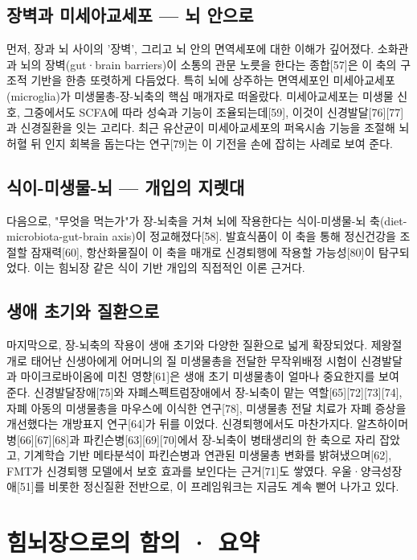 \documentclass[12pt,oneside]{book}
\begin{document}
\subsection{장벽과 미세아교세포 — 뇌 안으로}

먼저, 장과 뇌 사이의 '장벽', 그리고 뇌 안의 면역세포에 대한 이해가 깊어졌다. 소화관과 뇌의 장벽(gut·brain barriers)이 소통의 관문 노릇을 한다는 종합[57]은 이 축의 구조적 기반을 한층 또렷하게 다듬었다. 특히 뇌에 상주하는 면역세포인 미세아교세포(microglia)가 미생물총-장-뇌축의 핵심 매개자로 떠올랐다. 미세아교세포는 미생물 신호, 그중에서도 SCFA에 따라 성숙과 기능이 조율되는데[59], 이것이 신경발달[76][77]과 신경질환을 잇는 고리다. 최근 유산균이 미세아교세포의 퍼옥시솜 기능을 조절해 뇌허혈 뒤 인지 회복을 돕는다는 연구[79]는 이 기전을 손에 잡히는 사례로 보여 준다.

\subsection{식이-미생물-뇌 — 개입의 지렛대}

다음으로, "무엇을 먹는가"가 장-뇌축을 거쳐 뇌에 작용한다는 식이-미생물-뇌 축(diet-microbiota-gut-brain axis)이 정교해졌다[58]. 발효식품이 이 축을 통해 정신건강을 조절할 잠재력[60], 항산화물질이 이 축을 매개로 신경퇴행에 작용할 가능성[80]이 탐구되었다. 이는 힘뇌장 같은 식이 기반 개입의 직접적인 이론 근거다.

\subsection{생애 초기와 질환으로}

마지막으로, 장-뇌축의 작용이 생애 초기와 다양한 질환으로 넓게 확장되었다. 제왕절개로 태어난 신생아에게 어머니의 질 미생물총을 전달한 무작위배정 시험이 신경발달과 마이크로바이옴에 미친 영향[61]은 생애 초기 미생물총이 얼마나 중요한지를 보여 준다. 신경발달장애[75]와 자폐스펙트럼장애에서 장-뇌축이 맡는 역할[65][72][73][74], 자폐 아동의 미생물총을 마우스에 이식한 연구[78], 미생물총 전달 치료가 자폐 증상을 개선했다는 개방표지 연구[64]가 뒤를 이었다. 신경퇴행에서도 마찬가지다. 알츠하이머병[66][67][68]과 파킨슨병[63][69][70]에서 장-뇌축이 병태생리의 한 축으로 자리 잡았고, 기계학습 기반 메타분석이 파킨슨병과 연관된 미생물총 변화를 밝혀냈으며[62], FMT가 신경퇴행 모델에서 보호 효과를 보인다는 근거[71]도 쌓였다. 우울·양극성장애[51]를 비롯한 정신질환 전반으로, 이 프레임워크는 지금도 계속 뻗어 나가고 있다.

\section{힘뇌장으로의 함의 · 요약}
\end{document}
